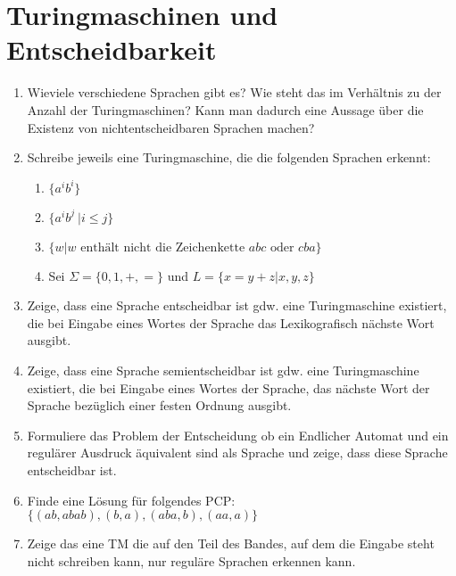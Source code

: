 \documentclass{article}
\begin{document}
\section{Turingmaschinen und Entscheidbarkeit}
\begin{enumerate}
\item Wieviele verschiedene Sprachen gibt es? Wie steht das im Verhältnis zu der Anzahl der Turingmaschinen? Kann man dadurch eine Aussage über die Existenz von nichtentscheidbaren Sprachen machen?
\item Schreibe jeweils eine Turingmaschine, die die folgenden Sprachen erkennt:
\begin{enumerate}
\item $\{a^ib^i\}$
\item $\{a^ib^j\ | i \leq j\}$
\item $\{w | w\mbox{ enthält nicht die Zeichenkette } abc \mbox{ oder }cba\}$
\item Sei $\Sigma = \{0,1,+,=\}$ und $L = \{x=y+z | x,y,z \}$
\end{enumerate}
\item Zeige, dass eine Sprache entscheidbar ist gdw. eine Turingmaschine existiert, die bei Eingabe eines Wortes der Sprache das Lexikografisch nächste Wort ausgibt.
\item Zeige, dass eine Sprache semientscheidbar ist gdw. eine Turingmaschine existiert, die bei Eingabe eines Wortes der Sprache, das nächste Wort der Sprache bezüglich einer festen Ordnung ausgibt.
\item Formuliere das Problem der Entscheidung ob ein Endlicher Automat und ein regulärer Ausdruck äquivalent sind als Sprache und zeige, dass diese Sprache entscheidbar ist.
\item Finde eine Lösung für folgendes PCP: $\{(ab,abab),(b,a),(aba,b),(aa,a)\}$
\item Zeige das eine TM die auf den Teil des Bandes, auf dem die Eingabe steht nicht schreiben kann, nur reguläre Sprachen erkennen kann.
\end{enumerate}
\end{document}
